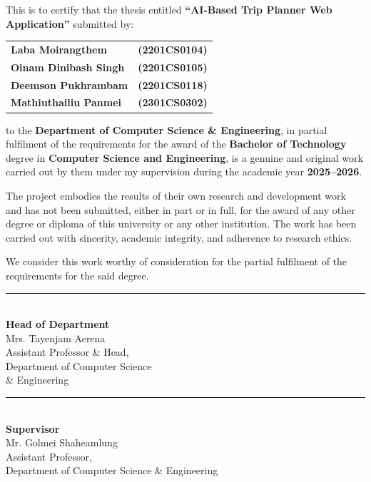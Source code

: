 {
\fontsize{12}{14}\selectfont
This is to certify that the thesis entitled \textbf{``AI-Based Trip Planner Web Application''} submitted by:
\begin{center}
    \begin{tabular}{l l}
    \textbf{Laba Moirangthem} & \textbf{(2201CS0104)} \\
    \textbf{Oinam Dinibash Singh} & \textbf{(2201CS0105)} \\    
    \textbf{Deemson Pukhrambam} & \textbf{(2201CS0118)} \\
    \textbf{Mathiuthailiu Panmei} & \textbf{(2301CS0302)} \\
    \end{tabular}
\end{center}
\noindent
to the \textbf{Department of Computer Science \& Engineering}, in partial fulfilment of the requirements for the award of the \textbf{Bachelor of Technology} degree in \textbf{Computer Science and Engineering}, is a genuine and original work carried out by them under my supervision during the academic year \textbf{2025--2026}.

\noindent
The project embodies the results of their own research and development work and has not been submitted, either in part or in full, for the award of any other degree or diploma of this university or any other institution. The work has been carried out with sincerity, academic integrity, and adherence to research ethics.

\noindent
We consider this work worthy of consideration for the partial fulfilment of the requirements for the said degree.

\vfill

\noindent
\begin{minipage}[t]{0.48\textwidth}
    \raggedright
    \rule{5cm}{0.4pt}\\[0.5em]
    \textbf{Head of Department}\\[0.3em]
    Mrs. Tayenjam Aerena\\
    Assistant Professor \& Head,\\
    Department of Computer Science \\\& Engineering
\end{minipage}%
\hfill
\begin{minipage}[t]{0.48\textwidth}
    \raggedleft
    \begin{minipage}[t]{6cm}
        \raggedright
        \rule{5cm}{0.4pt}\\[0.5em]
        \textbf{Supervisor}\\[0.3em]
        Mr. Golmei Shaheamlung\\
        Assistant Professor,\\
        Department of Computer Science \& Engineering
    \end{minipage}
\end{minipage}
}
